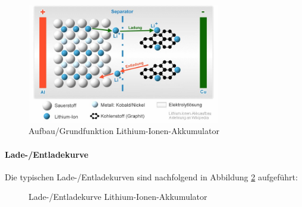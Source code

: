\begin{figure}[h!]
	\centering
\includegraphics[width=0.75\textwidth]{images/aufbau_liion.jpg}
	\caption{Aufbau/Grundfunktion Lithium-Ionen-Akkumulator \cite{liion_akku_aufbau_funktion1}}
	\label{fig:liion_akku}
\end{figure}

\newpage

\paragraph{Lade-/Entladekurve}
Die typischen Lade-/Entladekurven sind nachfolgend in Abbildung \ref{fig:liion_akku_kurve} aufgeführt:

\begin{figure}[h!]
\caption{Lade-/Entladekurve Lithium-Ionen-Akkumulator}
\label{fig:liion_akku_kurve}
\end{figure}


